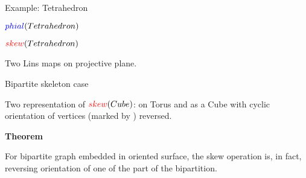 \documentclass[%
pdf,
colorBG,
slideColor,
]{prosper}
\begin{document}
\begin{slide}{Example: Tetrahedron}
\begin{center}
\begin{minipage}{50mm}
\par
$\textcolor{blue}{phial}(Tetrahedron)$
\end{minipage}
\begin{minipage}{50mm}
\par
$\textcolor{red}{skew}(Tetrahedron)$
\end{minipage}
\end{center}
\begin{center}
Two Lins maps on projective plane.
\end{center}

\end{slide}





\begin{slide}{Bipartite skeleton case}

\begin{center}
\begin{minipage}{50mm}
\end{minipage}
\begin{minipage}{50mm}
\end{minipage}
\end{center}
\begin{center}
Two representation of $\textcolor{red}{skew}(Cube)$: on Torus and as a Cube with cyclic orientation of vertices (marked by ) reversed.
\end{center}
{\it 

{\bf Theorem}

For bipartite graph embedded in oriented surface, the skew operation is, in fact, reversing orientation of one of the part of the bipartition.

}




\end{slide}
\end{document}
